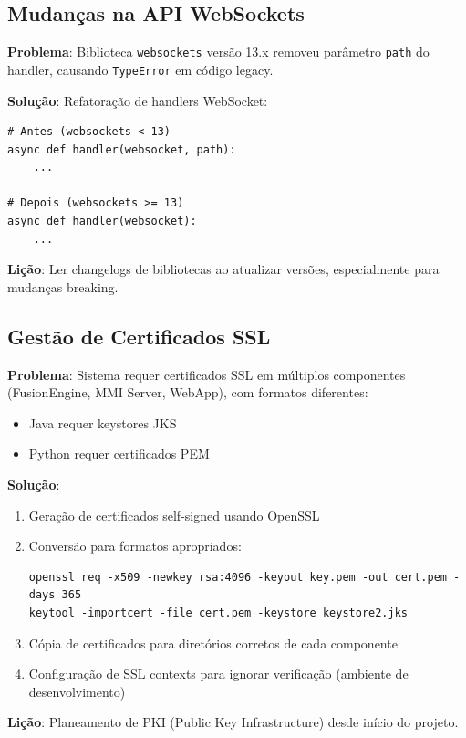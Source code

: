 \subsection{Mudanças na API WebSockets}

\textbf{Problema}: Biblioteca \texttt{websockets} versão 13.x removeu parâmetro \texttt{path} do handler, causando \texttt{TypeError} em código legacy.

\textbf{Solução}: Refatoração de handlers WebSocket:
\begin{verbatim}
# Antes (websockets < 13)
async def handler(websocket, path):
    ...

# Depois (websockets >= 13)
async def handler(websocket):
    ...
\end{verbatim}

\textbf{Lição}: Ler changelogs de bibliotecas ao atualizar versões, especialmente para mudanças breaking.

\subsection{Gestão de Certificados SSL}

\textbf{Problema}: Sistema requer certificados SSL em múltiplos componentes (FusionEngine, MMI Server, WebApp), com formatos diferentes:
\begin{itemize}
    \item Java requer keystores JKS
    \item Python requer certificados PEM
\end{itemize}

\textbf{Solução}:
\begin{enumerate}
    \item Geração de certificados self-signed usando OpenSSL
    \item Conversão para formatos apropriados:
    \begin{verbatim}
openssl req -x509 -newkey rsa:4096 -keyout key.pem -out cert.pem -days 365
keytool -importcert -file cert.pem -keystore keystore2.jks
    \end{verbatim}
    \item Cópia de certificados para diretórios corretos de cada componente
    \item Configuração de SSL contexts para ignorar verificação (ambiente de desenvolvimento)
\end{enumerate}

\textbf{Lição}: Planeamento de PKI (Public Key Infrastructure) desde início do projeto.

